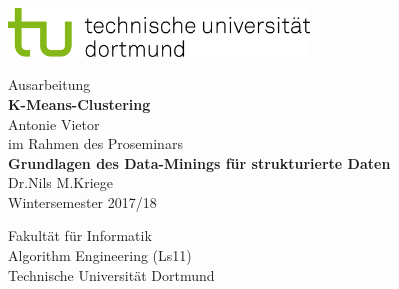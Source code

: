 \documentclass[a4paper,12pt,twoside]{article}
\begin{document}




\begin{titlepage}
\vspace*{-2cm}
\newlength{\links}
\setlength{\links}{-1.5cm} \sf \LARGE

\hspace*{\links}
\begin{minipage}{12.5cm}
\includegraphics[width=8cm]{tud_logo_rgb}
\end{minipage}

\vspace*{4cm}

\large
\begin{center}
{\Large Ausarbeitung} \\[1ex]
{\LARGE\textbf{K-Means-Clustering}}\\[3ex]
Antonie Vietor\\[1ex]
im Rahmen des Proseminars\\[1ex]
{\Large\textbf{Grundlagen des Data-Minings für strukturierte Daten}}\\[1ex]
Dr.\@ Nils M.\@ Kriege\\[1ex]
Wintersemester 2017/18
\end{center}


\vfill
\hspace*{\links}
\begin{minipage}[b]{8cm}
\normalsize \raggedright
Fakultät für Informatik\\
Algorithm Engineering (Ls11)\\
Technische Universität Dortmund
\end{minipage}

\end{titlepage}


\tableofcontents
\clearpage
\end{document}
